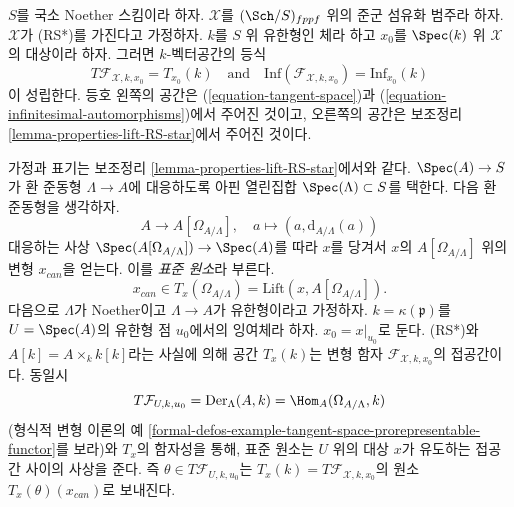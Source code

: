 \begin{remark}
\label{remark-compare-deformation-spaces}
$S$를 국소 Noether 스킴이라 하자. $\mathcal{X}$를
$(\Sch/S)_{fppf}$ 위의 준군 섬유화 범주라 하자.
$\mathcal{X}$가 (RS*)를 가진다고 가정하자.
$k$를 $S$ 위 유한형인 체라 하고 $x_0$를 $\Spec(k)$ 위 $\mathcal{X}$의
대상이라 하자. 그러면 $k$-벡터공간의 등식
$$
T\mathcal{F}_{\mathcal{X}, k, x_0} = T_{x_0}(k)
\quad\text{and}\quad
\text{Inf}(\mathcal{F}_{\mathcal{X}, k, x_0}) =
\text{Inf}_{x_0}(k)
$$
이 성립한다. 등호 왼쪽의 공간은 (\ref{equation-tangent-space})과
(\ref{equation-infinitesimal-automorphisms})에서 주어진 것이고,
오른쪽의 공간은 보조정리 \ref{lemma-properties-lift-RS-star}에서
주어진 것이다.
\end{remark}

\begin{remark}[표준 원소]
\label{remark-canonical-element}
가정과 표기는 보조정리 \ref{lemma-properties-lift-RS-star}에서와 같다.
$\Spec(A) \to S$가 환 준동형 $\Lambda \to A$에 대응하도록
아핀 열린집합 $\Spec(\Lambda) \subset S$를 택한다.
다음 환 준동형을 생각하자.
$$
A \longrightarrow A[\Omega_{A/\Lambda}],
\quad
a \longmapsto (a, \text{d}_{A/\Lambda}(a))
$$
대응하는 사상 $\Spec(A[\Omega_{A/\Lambda}]) \to \Spec(A)$를 따라
$x$를 당겨서 $x$의 $A[\Omega_{A/\Lambda}]$ 위의 변형 $x_{can}$을 얻는다.
이를 {\it 표준 원소}라 부른다.
$$
x_{can} \in T_x(\Omega_{A/\Lambda}) = \text{Lift}(x, A[\Omega_{A/\Lambda}]).
$$
다음으로 $\Lambda$가 Noether이고 $\Lambda \to A$가 유한형이라고
가정하자. $k = \kappa(\mathfrak p)$를 $U = \Spec(A)$의 유한형 점
$u_0$에서의 잉여체라 하자. $x_0 = x|_{u_0}$로 둔다.
(RS*)와 $A[k] = A \times_k k[k]$라는 사실에 의해 공간 $T_x(k)$는
변형 함자 $\mathcal{F}_{\mathcal{X}, k, x_0}$의 접공간이다.
동일시
$$
T\mathcal{F}_{U, k, u_0} =
\text{Der}_\Lambda(A, k) = \Hom_A(\Omega_{A/\Lambda}, k)
$$
(형식적 변형 이론의 예
\ref{formal-defos-example-tangent-space-prorepresentable-functor}를 보라)와
$T_x$의 함자성을 통해, 표준 원소는 $U$ 위의 대상 $x$가 유도하는
접공간 사이의 사상을 준다. 즉 $\theta \in T\mathcal{F}_{U, k, u_0}$는
$T_x(k) = T\mathcal{F}_{\mathcal{X}, k, x_0}$의 원소
$T_x(\theta)(x_{can})$로 보내진다.
\end{remark}

